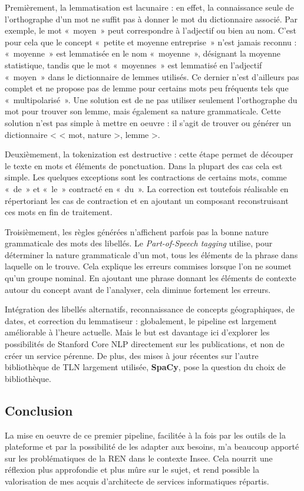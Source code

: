Premièrement, la lemmatisation est lacunaire : en effet, la connaissance seule de l'orthographe d'un mot ne suffit pas à donner le mot du dictionnaire associé. Par exemple, le mot «~moyen~» peut correspondre à l'adjectif ou bien au nom. C'est pour cela que le concept «~petite et moyenne entreprise~» n'est jamais reconnu : «~moyenne~» est lemmatisée en le nom «~moyenne~», désignant la moyenne statistique, tandis que le mot «~moyennes~» est lemmatisé en l'adjectif «~moyen~» dans le dictionnaire de lemmes utilisés. Ce dernier n'est d'ailleurs pas complet et ne propose pas de lemme pour certains mots peu fréquents tels que «~multipolarisé~». Une solution est de ne pas utiliser seulement l'orthographe du mot pour trouver son lemme, mais également sa nature grammaticale. Cette solution n'est pas simple à mettre en oeuvre : il s'agit de trouver ou générer un dictionnaire < < mot, nature >, lemme >.
\newline

Deuxièmement, la tokenization est destructive : cette étape permet de découper le texte en mots et éléments de ponctuation. Dans la plupart des cas cela est simple. Les quelques exceptions sont les contractions de certains mots, comme «~de~» et «~le~» contracté en «~du~». La correction est toutefois réalisable en répertoriant les cas de contraction et en ajoutant un composant reconstruisant ces mots en fin de traitement.
\newline

Troisièmement, les règles générées n'affichent parfois pas la bonne nature grammaticale des mots des libellés. Le \textit{Part-of-Speech tagging} utilise, pour déterminer la nature grammaticale d'un mot, tous les éléments de la phrase dans laquelle on le trouve. Cela explique les erreurs commises lorsque l'on ne soumet qu'un groupe nominal. En ajoutant une phrase donnant les éléments de contexte autour du concept avant de l'analyser, cela diminue fortement les erreurs.
\newline

Intégration des libellés alternatifs, reconnaissance de concepts géographiques, de dates, et correction du lemmatiseur : globalement, le pipeline est largement améliorable à l'heure actuelle. Mais le but est davantage ici d'explorer les possibilités de Stanford Core NLP directement sur les publications, et non de créer un service pérenne. De plus, des mises à jour récentes sur l'autre bibliothèque de TLN largement utilisée, \textbf{SpaCy}, pose la question du choix de bibliothèque.
\label{section 2.2.5}

\subsection*{Conclusion}
La mise en oeuvre de ce premier pipeline, facilitée à la fois par les outils de la plateforme et par la possibilité de les adapter aux besoins, m'a beaucoup apporté sur les problématiques de la REN dans le contexte Insee. Cela nourrit une réflexion plus approfondie et plus mûre sur le sujet, et rend possible la valorisation de mes acquis d'architecte de services informatiques répartis.

